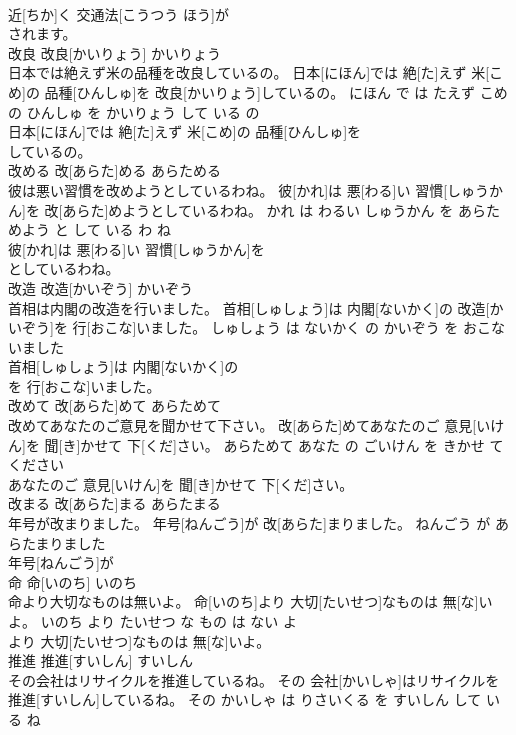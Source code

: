 \documentclass[8pt]{extreport}
\begin{document}
\begin{CJK}{UTF8}{min}
\\	近[ちか]く 交通法[こうつう ほう]が
\\	されます。			
\\	改良	改良[かいりょう]	かいりょう	
\\	日本では絶えず米の品種を改良しているの。	日本[にほん]では 絶[た]えず 米[こめ]の 品種[ひんしゅ]を 改良[かいりょう]しているの。	にほん で は たえず こめ の ひんしゅ を かいりょう して いる の	
\\	日本[にほん]では 絶[た]えず 米[こめ]の 品種[ひんしゅ]を
\\	しているの。			
\\	改める	改[あらた]める	あらためる	
\\	彼は悪い習慣を改めようとしているわね。	彼[かれ]は 悪[わる]い 習慣[しゅうかん]を 改[あらた]めようとしているわね。	かれ は わるい しゅうかん を あらためよう と して いる わ ね	
\\	彼[かれ]は 悪[わる]い 習慣[しゅうかん]を
\\	としているわね。			
\\	改造	改造[かいぞう]	かいぞう	
\\	首相は内閣の改造を行いました。	首相[しゅしょう]は 内閣[ないかく]の 改造[かいぞう]を 行[おこな]いました。	しゅしょう は ないかく の かいぞう を おこないました	
\\	首相[しゅしょう]は 内閣[ないかく]の
\\	を 行[おこな]いました。			
\\	改めて	改[あらた]めて	あらためて	
\\	改めてあなたのご意見を聞かせて下さい。	改[あらた]めてあなたのご 意見[いけん]を 聞[き]かせて 下[くだ]さい。	あらためて あなた の ごいけん を きかせ て ください	
\\	あなたのご 意見[いけん]を 聞[き]かせて 下[くだ]さい。			
\\	改まる	改[あらた]まる	あらたまる	
\\	年号が改まりました。	年号[ねんごう]が 改[あらた]まりました。	ねんごう が あらたまりました	
\\	年号[ねんごう]が
\\	命	命[いのち]	いのち	
\\	命より大切なものは無いよ。	命[いのち]より 大切[たいせつ]なものは 無[な]いよ。	いのち より たいせつ な もの は ない よ	
\\	より 大切[たいせつ]なものは 無[な]いよ。			
\\	推進	推進[すいしん]	すいしん	
\\	その会社はリサイクルを推進しているね。	その 会社[かいしゃ]はリサイクルを 推進[すいしん]しているね。	その かいしゃ は りさいくる を すいしん して いる ね	

\end{CJK}
\end{document}
